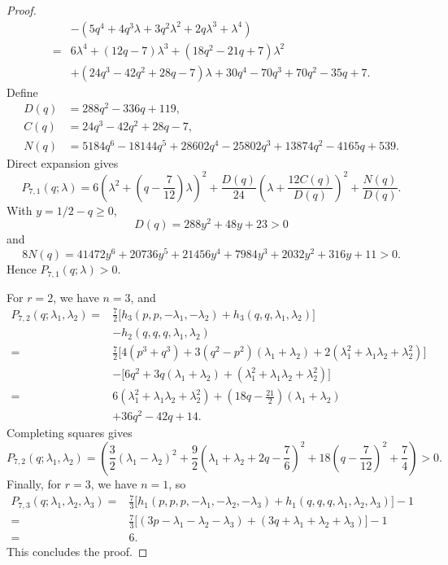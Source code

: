 \documentclass[11pt]{article}
\theoremstyle{remark}
\numberwithin{equation}{section}
\begin{document}
\begin{proof}
\[\begin{aligned}
         &-(5q^4+4q^3\lambda+3q^2\lambda^2
             +2q\lambda^3+\lambda^4)\\
      ={}&6\lambda^4+(12q-7)\lambda^3
          +(18q^2-21q+7)\lambda^2\\
         &+(24q^3-42q^2+28q-7)\lambda
          +30q^4-70q^3+70q^2-35q+7.
    \end{aligned}
  \]
  Define
  \[
    \begin{aligned}
      D(q)&=288q^2-336q+119,\\
      C(q)&=24q^3-42q^2+28q-7,\\
      N(q)&=5184q^6-18144q^5+28602q^4-25802q^3 +13874q^2-4165q+539.
    \end{aligned}
  \]
  Direct expansion gives
  \[
    P_{7,1}(q;\lambda)=
      6\left(\lambda^2+\left(q-\frac7{12}\right)\lambda\right)^2+\frac{D(q)}{24}
      \left(\lambda+\frac{12C(q)}{D(q)}\right)^2
      +\frac{N(q)}{D(q)}.
  \]
  With $y=1/2-q\ge0$,
  \[
    D(q)=288y^2+48y+23>0
  \]
  and
  \[
    8N(q)=41472y^6+20736y^5+21456y^4+7984y^3+2032y^2+316y+11>0.
  \]
  Hence $P_{7,1}(q;\lambda)>0$.

  For $r=2$, we have $n=3$, and
  \[
    \begin{aligned}
      P_{7,2}(q;\lambda_1,\lambda_2)
      ={}&\frac72\bigl[
        h_3(p,p,-\lambda_1,-\lambda_2)
        +h_3(q,q,\lambda_1,\lambda_2)\bigr]\\
        &-h_2(q,q,q,\lambda_1,\lambda_2)\\
      ={}&\frac72\bigl[4(p^3+q^3)
        +3(q^2-p^2)(\lambda_1+\lambda_2)
        +2(\lambda_1^2+\lambda_1\lambda_2+\lambda_2^2)\bigr]\\
        &-\bigl[6q^2+3q(\lambda_1+\lambda_2)
          +(\lambda_1^2+\lambda_1\lambda_2+\lambda_2^2)\bigr]\\
      ={}&6(\lambda_1^2+\lambda_1\lambda_2+\lambda_2^2)
        +\left(18q-\frac{21}{2}\right)(\lambda_1+\lambda_2)\\
        &+36q^2-42q+14.
    \end{aligned}
  \]
  Completing squares gives
  \[
      P_{7,2}(q;\lambda_1,\lambda_2)=
      \left(\frac32(\lambda_1-\lambda_2)^2
      +\frac92\left(\lambda_1+\lambda_2+2q-\frac76\right)^2
      +18\left(q-\frac7{12}\right)^2+\frac74\right)>0.
  \]
  Finally, for $r=3$, we have $n=1$, so
  \[
    \begin{aligned}
      P_{7,3}(q;\lambda_1,\lambda_2,\lambda_3)
      ={}&\frac73\bigl[
        h_1(p,p,p,-\lambda_1,-\lambda_2,-\lambda_3)
        +h_1(q,q,q,\lambda_1,\lambda_2,\lambda_3)\bigr]-1\\
      ={}&\frac73\bigl[(3p-\lambda_1-\lambda_2-\lambda_3)
        +(3q+\lambda_1+\lambda_2+\lambda_3)\bigr]-1
      \\
      ={}&6.
    \end{aligned}
  \]
This concludes the proof.
\end{proof}
\end{document}
